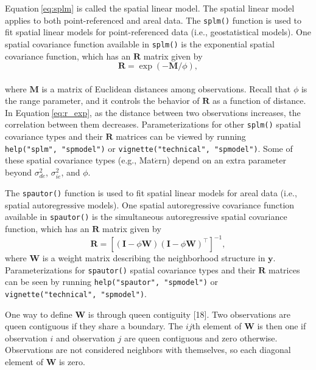 \documentclass[10pt,letterpaper]{article}
\begin{document}
Equation\(~\)\ref{eq:splm} is called the spatial linear model. The
spatial linear model applies to both point-referenced and areal data.
The \texttt{splm()} function is used to fit spatial linear models for
point-referenced data (i.e., geostatistical models). One spatial
covariance function available in \texttt{splm()} is the exponential
spatial covariance function, which has an \(\mathbf{R}\) matrix given by
\begin{equation}\label{eq:r_exp}
  \mathbf{R} = \exp(-\mathbf{M} / \phi),
\end{equation}\\
where \(\mathbf{M}\) is a matrix of Euclidean distances among
observations. Recall that \(\phi\) is the range parameter, and it
controls the behavior of \(\mathbf{R}\) as a function of distance. In
Equation\(~\)\ref{eq:r_exp}, as the distance between two observations
increases, the correlation between them decreases. Parameterizations for
other \texttt{splm()} spatial covariance types and their \(\mathbf{R}\)
matrices can be viewed by running \texttt{help("splm",\ "spmodel")} or
\texttt{vignette("technical",\ "spmodel")}. Some of these spatial
covariance types (e.g., Mat\(\acute{e}\)rn) depend on an extra parameter
beyond \(\sigma^2_{de}\), \(\sigma^2_{ie}\), and \(\phi\).

The \texttt{spautor()} function is used to fit spatial linear models for
areal data (i.e., spatial autoregressive models). One spatial
autoregressive covariance function available in \texttt{spautor()} is
the simultaneous autoregressive spatial covariance function, which has
an \(\mathbf{R}\) matrix given by \begin{equation*}
  \mathbf{R} = [(\mathbf{I} - \phi \mathbf{W})(\mathbf{I} - \phi \mathbf{W})^\top]^{-1},
\end{equation*} where \(\mathbf{W}\) is a weight matrix describing the
neighborhood structure in \(\mathbf{y}\). Parameterizations for
\texttt{spautor()} spatial covariance types and their \(\mathbf{R}\)
matrices can be seen by running \texttt{help("spautor",\ "spmodel")} or
\texttt{vignette("technical",\ "spmodel")}.

One way to define \(\mathbf{W}\) is through queen contiguity {[}18{]}.
Two observations are queen contiguous if they share a boundary. The
\(ij\)th element of \(\mathbf{W}\) is then one if observation \(i\) and
observation \(j\) are queen contiguous and zero otherwise. Observations
are not considered neighbors with themselves, so each diagonal element
of \(\mathbf{W}\) is zero.
\end{document}
